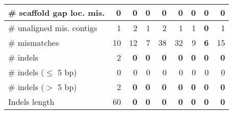 \documentclass[12pt,a4paper]{article}
\begin{document}
\begin{table}[ht]
\begin{center}
\begin{tabular}{|l*{8}{|r}|}
\# scaffold gap loc. mis. & 0 & 0 & 0 & 0 & 0 & 0 & 0 & 0 \\ \hline
\# unaligned mis. contigs & 1 & 2 & 1 & 2 & 1 & 1 & {\bf 0} & 1 \\ \hline
\# mismatches & 10 & 12 & 7 & 38 & 32 & 9 & {\bf 6} & 15 \\ \hline
\# indels & 2 & {\bf 0} & {\bf 0} & {\bf 0} & {\bf 0} & {\bf 0} & {\bf 0} & {\bf 0} \\ \hline
\hspace{5mm}\# indels ($\leq$ 5 bp) & 0 & 0 & 0 & 0 & 0 & 0 & 0 & 0 \\ \hline
\hspace{5mm}\# indels ($>$ 5 bp) & 2 & {\bf 0} & {\bf 0} & {\bf 0} & {\bf 0} & {\bf 0} & {\bf 0} & {\bf 0} \\ \hline
Indels length & 60 & {\bf 0} & {\bf 0} & {\bf 0} & {\bf 0} & {\bf 0} & {\bf 0} & {\bf 0} \\ \hline
\end{tabular}
\end{center}
\end{table}
\end{document}
